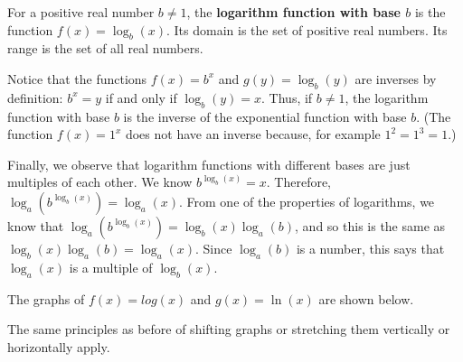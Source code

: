 \documentclass[11pt]{book}               %
\begin{document}
For a positive real number $b \neq 1$, the \textbf{logarithm function with base $b$} is the function $f(x) = \log_b(x)$.
Its domain is the set of positive real numbers.  Its range is the set of all real numbers.

Notice that the functions $f(x) = b^x$ and $g(y) = \log_b(y)$ are inverses by definition:  
$b^x = y$ if and only if $\log_b(y) = x$.  
Thus, if $b \neq 1$, the logarithm function with base $b$ is the inverse of the exponential function 
with base $b$.  (The function $f(x) = 1^x$ does not have an inverse because, for example $1^2 = 1^3 = 1$.)

Finally, we observe that logarithm functions with different bases are just multiples of each other.
We know $b^{\log_b(x)} = x$.  
Therefore, 
$\log_a\left(b^{\log_b(x)}\right) = \log_a(x)$.
From one of the properties of logarithms, we know that $\log_a\left(b^{\log_b(x)}\right) =\log_b(x) \log_a(b)$, and so this is the same as 
$\log_b(x) \log_a(b) = \log_a(x)$.
Since $\log_a(b)$ is a number, this says that $\log_a(x)$ is a multiple of $\log_b(x)$.

The graphs of $f(x) = log(x)$ and $g(x) = \ln(x)$ are shown below.

\begin{center}
\end{center}

The same principles as before of shifting graphs or stretching them vertically or horizontally apply.
\end{document}
